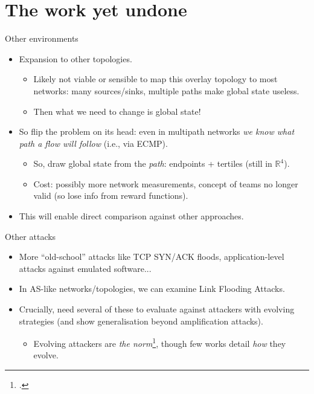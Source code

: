 \documentclass[aspectratio=169,xcolor={dvipsnames}
,hide notes
]{beamer}
\begin{document}
\section{The work yet undone}

\begin{frame}{Other environments}
\begin{itemize}
	\item Expansion to other topologies.
	\begin{itemize}
		\item Likely not viable or sensible to map this overlay topology to most networks: many sources/sinks, multiple paths make global state useless.
		\item \alert{Then what we need to change is global state!}
	\end{itemize}
	\item So flip the problem on its head: even in multipath networks \emph{we know what path a flow will follow} (i.e., via ECMP).
	\begin{itemize}
		\item So, draw global state from the \emph{path}: endpoints + tertiles (still in $\mathbb{R}^{4}$).
		\item Cost: possibly more network measurements, concept of teams no longer valid (so lose info from reward functions).
	\end{itemize}
	\item This will enable direct comparison against other approaches.
\end{itemize}
\end{frame}

\begin{frame}{Other attacks}
\begin{itemize}
	\item More ``old-school'' attacks like TCP SYN/ACK floods, application-level attacks against emulated software...
	\item In AS-like networks/topologies, we can examine \alert{Link Flooding Attacks}.
	\item Crucially, need several of these to evaluate against attackers with \alert{evolving strategies} (and show generalisation beyond amplification attacks).
	\begin{itemize}
		\item Evolving attackers are \emph{the norm}\footcite{DBLP:conf/spw/KangGS16}, though few works detail \emph{how} they evolve.
	\end{itemize}
\end{itemize}
\end{frame}
\end{document}
